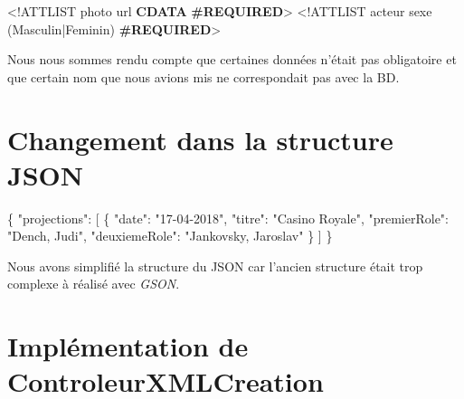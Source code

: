 \documentclass[]{article}
\newenvironment{Shaded}{}{}
\newcommand{\KeywordTok}[1]{\textcolor[rgb]{0.00,0.44,0.13}{\textbf{{#1}}}}
\newcommand{\DataTypeTok}[1]{\textcolor[rgb]{0.56,0.13,0.00}{{#1}}}
\newcommand{\DecValTok}[1]{\textcolor[rgb]{0.25,0.63,0.44}{{#1}}}
\newcommand{\StringTok}[1]{\textcolor[rgb]{0.25,0.44,0.63}{{#1}}}
\newcommand{\OtherTok}[1]{\textcolor[rgb]{0.00,0.44,0.13}{{#1}}}
\newcommand{\FunctionTok}[1]{\textcolor[rgb]{0.02,0.16,0.49}{{#1}}}
\begin{document}
\begin{Shaded}
\begin{Highlighting}[]
\DataTypeTok{<!ATTLIST} \FunctionTok{photo} \FunctionTok{url} \KeywordTok{CDATA} \KeywordTok{#REQUIRED}\DataTypeTok{>} 
\DataTypeTok{<!ATTLIST} \FunctionTok{acteur} \FunctionTok{sexe} \DecValTok{(}\FunctionTok{Masculin}\DecValTok{|}\FunctionTok{Feminin}\DecValTok{)} \KeywordTok{#REQUIRED}\DataTypeTok{>}
\end{Highlighting}
\end{Shaded}

Nous nous sommes rendu compte que certaines données n'était pas
obligatoire et que certain nom que nous avions mis ne correspondait pas
avec la BD.

\section{Changement dans la structure JSON}\label{header-n34}

\begin{Shaded}
\begin{Highlighting}[]
\FunctionTok{\{}
  \DataTypeTok{"projections"}\FunctionTok{:} \OtherTok{[}
    \FunctionTok{\{}
      \DataTypeTok{"date"}\FunctionTok{:} \StringTok{"17-04-2018"}\FunctionTok{,}
      \DataTypeTok{"titre"}\FunctionTok{:} \StringTok{"Casino Royale"}\FunctionTok{,}
      \DataTypeTok{"premierRole"}\FunctionTok{:} \StringTok{"Dench, Judi"}\FunctionTok{,}
      \DataTypeTok{"deuxiemeRole"}\FunctionTok{:} \StringTok{"Jankovsky, Jaroslav"}
    \FunctionTok{\}}
  \OtherTok{]}
\FunctionTok{\}}
\end{Highlighting}
\end{Shaded}

Nous avons simplifié la structure du JSON car l'ancien structure était
trop complexe à réalisé avec \emph{GSON}.

\newpage
\section{Implémentation de ControleurXMLCreation}\label{header-n66}
\end{document}
